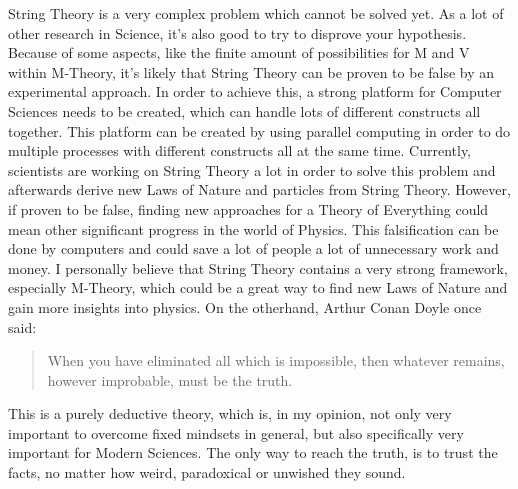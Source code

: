 \documentclass[../paper.tex]{subfiles}
\begin{document}
String Theory is a very complex problem which cannot be solved yet. As a lot of other research in Science, it's also good to try to disprove your hypothesis. Because of some aspects, like the finite amount of possibilities for M and V within M-Theory, it's likely that String Theory can be proven to be false by an experimental approach. In order to achieve this, a strong platform for Computer Sciences needs to be created, which can handle lots of different constructs all together. This platform can be created by using parallel computing in order to do multiple processes with different constructs all at the same time. Currently, scientists are working on String Theory a lot in order to solve this problem and afterwards derive new Laws of Nature and particles from String Theory. However, if proven to be false, finding new approaches for a Theory of Everything could mean other significant progress in the world of Physics. This falsification can be done by computers and could save a lot of people a lot of unnecessary work and money. I personally believe that String Theory contains a very strong framework, especially M-Theory, which could be a great way to find new Laws of Nature and gain more insights into physics. On the otherhand, Arthur Conan Doyle once said:
\begin{quote}
    When you have eliminated all which is impossible, then whatever remains, however improbable, must be the truth.
    \author{Arthur Conan Doyle}
    \label{Deduction}
\end{quote}
This is a purely deductive theory, which is, in my opinion, not only very important to overcome fixed mindsets in general, but also specifically very important for Modern Sciences. The only way to reach the truth, is to trust the facts, no matter how weird, paradoxical or unwished they sound. 
\end{document}
